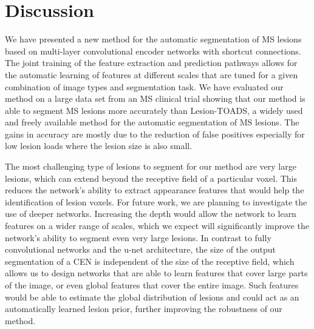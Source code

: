 \section{Discussion}


We have presented a new method for the automatic segmentation of MS lesions
based on multi-layer convolutional encoder networks with shortcut connections.
The joint training of the feature extraction and prediction pathways allows for
the automatic learning of features at different scales that are tuned for a
given combination of image types and segmentation task. We have evaluated our
method on a large data set from an MS clinical trial showing that our method is
able to segment MS lesions more accurately than Lesion-TOADS, a widely used and
freely available method for the automatic segmentation of MS lesions. The gains
in accuracy are mostly due to the reduction of false positives especially for
low lesion loads where the lesion size is also small.

The most challenging type of lesions to segment for our method are very large
lesions, which can extend beyond the receptive field of a particular voxel. This
reduces the network's ability to extract appearance features that would help
the identification of lesion voxels. For future work, we are planning to
investigate the use of deeper networks. Increasing the depth would allow the
network to learn features on a wider range of scales, which we expect will
significantly improve the network's ability to segment even very large lesions.
In contrast to fully convolutional networks and the u-net architecture, the size
of the output segmentation of a CEN is independent of the size of the receptive
field, which allows us to design networks that are able to learn features that cover
large parts of the image, or even global features that cover the entire image.
Such features would be able to estimate the global distribution of lesions and
could act as an automatically learned lesion prior, further improving the
robustness of our method.


